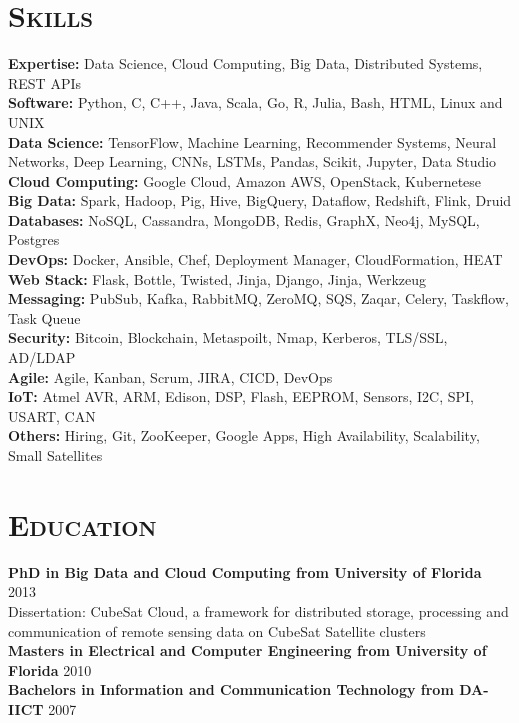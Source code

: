\begin{resume}
\section{\textsc{Skills}}
{\bf Expertise:} Data Science, Cloud Computing, Big Data, Distributed Systems, REST APIs
\\ {\bf Software:} Python, C, C++, Java, Scala, Go, R, Julia, Bash, HTML, Linux and UNIX
\\ {\bf Data Science:} TensorFlow, Machine Learning, Recommender Systems, Neural Networks, Deep Learning, CNNs, LSTMs, Pandas, Scikit, Jupyter, Data Studio 
\\ {\bf Cloud Computing:} Google Cloud, Amazon AWS, OpenStack, Kubernetese
\\ {\bf Big Data:} Spark, Hadoop, Pig, Hive, BigQuery, Dataflow, Redshift, Flink, Druid
\\ {\bf Databases:} NoSQL, Cassandra, MongoDB, Redis, GraphX, Neo4j, MySQL, Postgres
\\ {\bf DevOps:} Docker, Ansible, Chef, Deployment Manager, CloudFormation, HEAT
\\ {\bf Web Stack:} Flask, Bottle, Twisted, Jinja, Django, Jinja, Werkzeug
\\ {\bf Messaging:} PubSub, Kafka, RabbitMQ, ZeroMQ, SQS, Zaqar, Celery, Taskflow, Task Queue
\\ {\bf Security:} Bitcoin, Blockchain, Metaspoilt, Nmap, Kerberos, TLS/SSL, AD/LDAP
\\ {\bf Agile:} Agile, Kanban, Scrum, JIRA, CICD, DevOps
\\ {\bf IoT:} Atmel AVR, ARM, Edison, DSP, Flash, EEPROM, Sensors, I2C, SPI, USART, CAN
\\ {\bf Others:} Hiring, Git, ZooKeeper, Google Apps, High Availability, Scalability, Small Satellites


\section{\textsc{Education}}
\textbf{PhD in Big Data and Cloud Computing from University of Florida} \hfill 2013 \\
Dissertation: CubeSat Cloud, a framework for distributed storage, processing and communication of remote sensing data on CubeSat Satellite clusters\\
\textbf{Masters in Electrical and Computer Engineering from University of Florida} \hfill 2010 \\
\textbf{Bachelors in Information and Communication Technology from DA-IICT} \hfill 2007


\end{resume}
